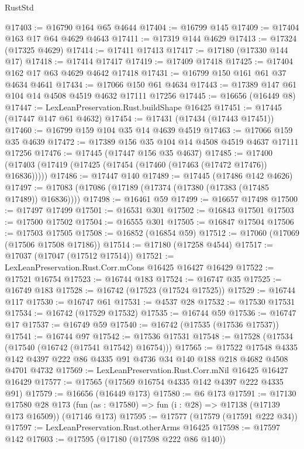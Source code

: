 \begin{lexlean}{RustStd}
\begin{coremodule}
{\begin{coremodule}
{{{{{{{{{{{{{{{{{{{{{{{{{{{{{{{{{{{{{{{{{{{{{{{{{{{{{{{@17403 := @16790 @164 @65 @4644
@17404 := @16799 @145
@17409 := @17404 @163 @17 @64 @4629 @4643
@17411 := @17319 @144 @4629
@17413 := @17324 (@17325 @4629)
@17414 := @17411 @17413
@17417 := @17180 (@17330 @144 @17)
@17418 := @17414 @17417
@17419 := @17409 @17418
@17425 := @17404 @162 @17 @63 @4629 @4642 @17418
@17431 := @16799 @150 @161 @61 @37 @4634 @4641
@17434 := @17066 @150 @61 @4634
@17443 := @17389 @147 @61 @104 @14 @4508 @4519 @4632 @17111 @17256
@17445 := @16656 (@16449 @8)
@17447 := LexLeanPreservation.Rust.buildShape @16425
@17451 := @17445 (@17447 @147 @61 @4632)
@17454 := @17431 (@17434 (@17443 @17451))
@17460 := @16799 @159 @104 @35 @14 @4639 @4519
@17463 := @17066 @159 @35 @4639
@17472 := @17389 @156 @35 @104 @14 @4508 @4519 @4637 @17111 @17256
@17476 := @17445 (@17447 @156 @35 @4637)
@17485 := @17400 (@17403 (@17419 (@17425 (@17454 (@17460 (@17463 (@17472 @17476)) @16836)))))
@17486 := @17447 @140
@17489 := @17445 (@17486 @142 @4626)
@17497 := @17083 (@17086 (@17189 (@17374 (@17380 (@17383 (@17485 @17489)) @16836))))
@17498 := @16461 @59
@17499 := @16657 @17498
@17500 := @17497 @17499
@17501 := @16531 @301
@17502 := @16843 @17501
@17503 := @17500 @17502
@17504 := @16555 @301
@17505 := @16847 @17504
@17506 := @17503 @17505
@17508 := @16852 (@16854 @59)
@17512 := @17060 (@17069 (@17506 @17508 @17186))
@17514 := @17180 (@17258 @4544)
@17517 := @17037 (@17047 (@17512 @17514))
@17521 := LexLeanPreservation.Rust.Corr.mCons @16425 @16427 @16429
@17522 := @17521 @16754
@17523 := @16744 @183
@17524 := @16747 @35
@17525 := @16749 @183
@17528 := @16742 (@17523 (@17524 @17525))
@17529 := @16744 @117
@17530 := @16747 @61
@17531 := @4537 @28
@17532 := @17530 @17531
@17534 := @16742 (@17529 @17532)
@17535 := @16744 @59
@17536 := @16747 @17
@17537 := @16749 @59
@17540 := @16742 (@17535 (@17536 @17537))
@17541 := @16744 @97
@17542 := @17536 @17531
@17548 := @17528 (@17534 (@17540 (@16742 (@17541 @17542) @16754)))
@17565 := @17522
    @17548
    @4335
    @142
    @4397
    @222
    @86
    @4335
    @91
    @4736
    @34
    @140
    @188
    @218
    @4682
    @4508
    @4701
    @4732
@17569 := LexLeanPreservation.Rust.Corr.mNil @16425 @16427 @16429
@17577 := @17565 (@17569 @16754 @4335 @142 @4397 @222 @4335 @91)
@17579 := @16656 (@16449 @173)
@17580 := @6 @173
@17591 := @17130
    @17580
    @28
    @173
    (fun (as : @17580) => fun (i : @28) => @17138 (@17139 @173 @16509))
    (@17146 @173)
@17595 := @17577 (@17579 (@17591 @222 @34))
@17597 := LexLeanPreservation.Rust.otherArms @16425
@17598 := @17597 @142
@17603 := @17595 (@17180 (@17598 @222 @86 @140))
}}}}}}}}}}}}}}}}}}}}}}}}}}}}}}}}}}}}}}}}}}}}}}}}}}}}}}}
\end{coremodule}}
\end{coremodule}
\end{lexlean}
